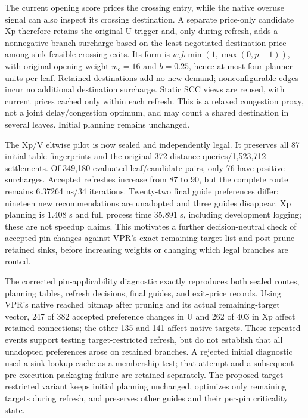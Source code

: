 \documentclass[conference,10pt]{IEEEtran}
\begin{document}
The current opening score prices the crossing entry, while the native overuse signal can also inspect its crossing destination. A separate price-only candidate Xp therefore retains the original U trigger and, only during refresh, adds a nonnegative branch surcharge based on the least negotiated destination price among sink-feasible crossing exits. Its form is $w_o b\min(1,\max(0,p-1))$, with original opening weight $w_o=16$ and $b=0.25$, hence at most four planner units per leaf. Retained destinations add no new demand; nonconfigurable edges incur no additional destination surcharge. Static SCC views are reused, with current prices cached only within each refresh. This is a relaxed congestion proxy, not a joint delay/congestion optimum, and may count a shared destination in several leaves. Initial planning remains unchanged.

The Xp/V eltwise pilot is now sealed and independently legal. It preserves all 87 initial table fingerprints and the original 372 distance queries/1,523,712 settlements. Of 349,180 evaluated leaf/candidate pairs, only 76 have positive surcharges. Accepted refreshes increase from 87 to 90, but the complete route remains 6.37264 ns/34 iterations. Twenty-two final guide preferences differ: nineteen new recommendations are unadopted and three guides disappear. Xp planning is 1.408 s and full process time 35.891 s, including development logging; these are not speedup claims. This motivates a further decision-neutral check of accepted pin changes against VPR's exact remaining-target list and post-prune retained sinks, before increasing weights or changing which legal branches are routed.

The corrected pin-applicability diagnostic exactly reproduces both sealed routes, planning tables, refresh decisions, final guides, and exit-price records. Using VPR's native reached bitmap after pruning and its actual remaining-target vector, 247 of 382 accepted preference changes in U and 262 of 403 in Xp affect retained connections; the other 135 and 141 affect native targets. These repeated events support testing target-restricted refresh, but do not establish that all unadopted preferences arose on retained branches. A rejected initial diagnostic used a sink-lookup cache as a membership test; that attempt and a subsequent pre-execution packaging failure are retained separately. The proposed target-restricted variant keeps initial planning unchanged, optimizes only remaining targets during refresh, and preserves other guides and their per-pin criticality state.
\end{document}
